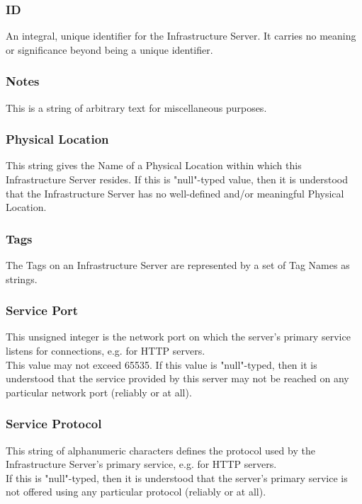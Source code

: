 \subsubsection{ID}
An integral, unique identifier for the Infrastructure Server. It carries no
meaning or significance beyond being a unique identifier.

\subsubsection{Notes}
This is a string of arbitrary text for miscellaneous purposes.

\subsubsection{Physical Location}
This string gives the Name of a Physical Location within which this
Infrastructure Server resides. If this is "null"-typed value, then it is
understood that the Infrastructure Server has no well-defined and/or
meaningful Physical Location.

\subsubsection{Tags}
The Tags on an Infrastructure Server are represented by a set of Tag Names as
strings.

\subsubsection{Service Port}
This unsigned integer is the network port on which the server's primary service
listens for connections, e.g.  for HTTP servers.\\
This value may not exceed 65535. If this value is "null"-typed, then it is
understood that the service provided by this server may not be reached on any
particular network port (reliably or at all).

\subsubsection{Service Protocol}
This string of alphanumeric characters defines the protocol used by the
Infrastructure Server's primary service, e.g.  for HTTP servers.\\
If this is "null"-typed, then it is understood that the server's primary service
is not offered using any particular protocol (reliably or at all).
